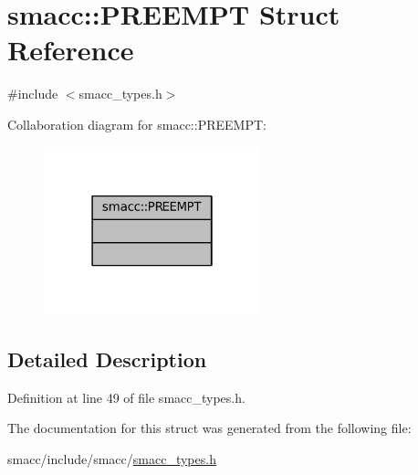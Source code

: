 \hypertarget{structsmacc_1_1PREEMPT}{}\section{smacc\+:\+:P\+R\+E\+E\+M\+PT Struct Reference}
\label{structsmacc_1_1PREEMPT}


{\ttfamily \#include $<$smacc\+\_\+types.\+h$>$}



Collaboration diagram for smacc\+:\+:P\+R\+E\+E\+M\+PT\+:
\nopagebreak
\begin{figure}[H]
\begin{center}
\leavevmode
\includegraphics[width=178pt]{structsmacc_1_1PREEMPT__coll__graph}
\end{center}
\end{figure}


\subsection{Detailed Description}


Definition at line 49 of file smacc\+\_\+types.\+h.



The documentation for this struct was generated from the following file\+:\begin{DoxyCompactItemize}
\item 
smacc/include/smacc/\hyperlink{smacc__types_8h}{smacc\+\_\+types.\+h}\end{DoxyCompactItemize}
